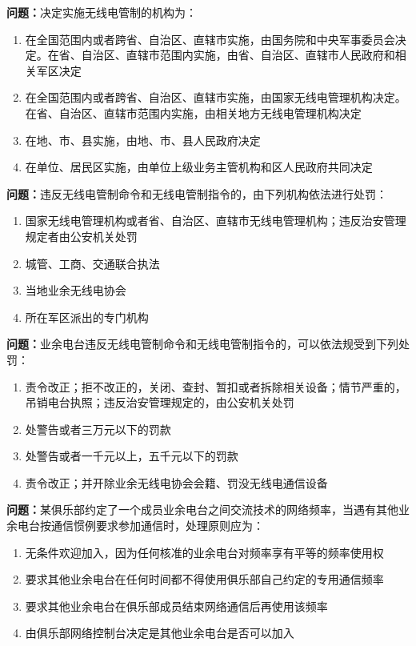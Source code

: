 \textbf{问题：}决定实施无线电管制的机构为：
\begin{enumerate}[label=\Alph*), leftmargin=1cm]
	\item 在全国范围内或者跨省、自治区、直辖市实施，由国务院和中央军事委员会决定。在省、自治区、直辖市范围内实施，由省、自治区、直辖市人民政府和相关军区决定
	\item 在全国范围内或者跨省、自治区、直辖市实施，由国家无线电管理机构决定。在省、自治区、直辖市范围内实施，由相关地方无线电管理机构决定
	\item 在地、市、县实施，由地、市、县人民政府决定
	\item 在单位、居民区实施，由单位上级业务主管机构和区人民政府共同决定
\end{enumerate}

\textbf{问题：}违反无线电管制命令和无线电管制指令的，由下列机构依法进行处罚：
\begin{enumerate}[label=\Alph*), leftmargin=1cm]
	\item 国家无线电管理机构或者省、自治区、直辖市无线电管理机构；违反治安管理规定者由公安机关处罚
	\item 城管、工商、交通联合执法
	\item 当地业余无线电协会
	\item 所在军区派出的专门机构
\end{enumerate}

\textbf{问题：}业余电台违反无线电管制命令和无线电管制指令的，可以依法规受到下列处罚：
\begin{enumerate}[label=\Alph*), leftmargin=1cm]
	\item  责令改正；拒不改正的，关闭、查封、暂扣或者拆除相关设备；情节严重的，吊销电台执照；违反治安管理规定的，由公安机关处罚
	\item  处警告或者三万元以下的罚款
	\item  处警告或者一千元以上，五千元以下的罚款
	\item  责令改正；并开除业余无线电协会会籍、罚没无线电通信设备
\end{enumerate}

\textbf{问题：}某俱乐部约定了一个成员业余电台之间交流技术的网络频率，当遇有其他业余电台按通信惯例要求参加通信时，处理原则应为：
\begin{enumerate}[label=\Alph*), leftmargin=1cm]
	\item 无条件欢迎加入，因为任何核准的业余电台对频率享有平等的频率使用权
	\item 要求其他业余电台在任何时间都不得使用俱乐部自己约定的专用通信频率
	\item 要求其他业余电台在俱乐部成员结束网络通信后再使用该频率
	\item 由俱乐部网络控制台决定是其他业余电台是否可以加入
\end{enumerate}

